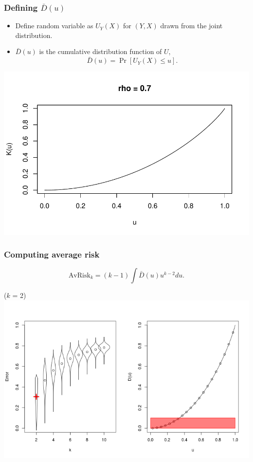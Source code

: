 \documentclass{beamer}
\begin{document}
\begin{frame}
\frametitle{Defining $\bar{D}(u)$}
\begin{itemize}
\item Define random variable as $U_Y(X)$ for $(Y, X)$ drawn from the joint distribution.\pause
\item $\bar{D}(u)$ is the cumulative distribution function of $U$,
\[
\bar{D}(u) = \Pr[U_Y(X) \leq u].
\]
\pause
\end{itemize}
\begin{center}
\includegraphics[scale = 0.45]{../extrapolation/illus_kfunc_0_7.pdf}
\end{center}
\end{frame}

\begin{frame}
\frametitle{Computing average risk}
\[
\text{AvRisk}_k = (k-1) \int \bar{D}(u) u^{k-2} du.
\]
\begin{center}
($k$ = 2)
\includegraphics[scale = 0.4, clip=true, trim=0 0.1in 0 0.7in]{../extrapolation/rho_0_7_fmla2.png}
\end{center}
\end{frame}
\end{document}
